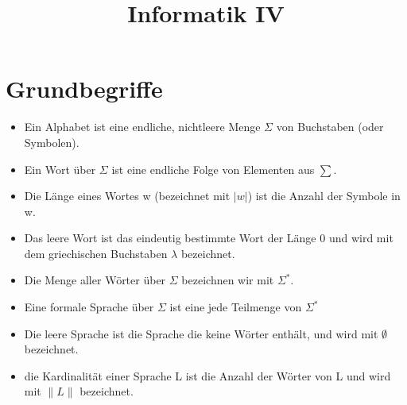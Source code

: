 \documentclass[9pt]{article}
\title{Informatik IV}
\author{}
\begin{document}

\section{Grundbegriffe}
\begin{itemize}
	\item Ein Alphabet ist eine endliche, nichtleere Menge $\Sigma$ von Buchstaben  (oder Symbolen).
	\item Ein Wort über $\Sigma$ ist eine endliche Folge von Elementen aus $\sum$.
	\item Die Länge eines Wortes w (bezeichnet mit $|w|$) ist die Anzahl der Symbole in w.
	\item Das leere Wort ist das eindeutig bestimmte Wort der Länge 0 und wird mit dem griechischen Buchstaben $\lambda$ bezeichnet.
	\item Die Menge aller Wörter über $\Sigma$ bezeichnen wir mit $\Sigma^*$.
	\item Eine formale Sprache über $\Sigma$ ist eine jede Teilmenge von $\Sigma^*$
	\item Die leere Sprache ist die Sprache die keine Wörter enthält, und wird mit $\emptyset$ bezeichnet.
	\item die Kardinalität einer Sprache L ist die Anzahl der Wörter von L und wird mit $\|L\|$ bezeichnet.
\end{itemize}
\end{document}
